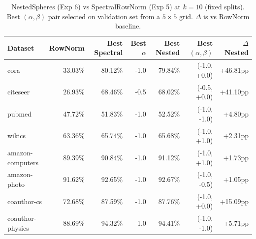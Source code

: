 \begin{table}[t]
\centering\small\setlength{\tabcolsep}{5pt}
\caption{NestedSpheres (Exp 6) vs SpectralRowNorm (Exp 5) at $k=10$ (fixed splits). Best $(\alpha,\beta)$ pair selected on validation set from a $5\times5$ grid. $\Delta$ is vs RowNorm baseline.}
\label{tab:nested_spheres}
\begin{tabular}{lrrrrrr}
\toprule
Dataset & RowNorm & Best Spectral & Best $\alpha$ & Best Nested & Best $(\alpha,\beta)$ & $\Delta$Nested \\
\midrule
cora & 33.03\% & 80.12\% & -1.0 & 79.84\% & (-1.0, +0.0) & +46.81pp \\
citeseer & 26.93\% & 68.46\% & -0.5 & 68.02\% & (-0.5, +0.0) & +41.10pp \\
pubmed & 47.72\% & 51.83\% & -1.0 & 52.52\% & (-1.0, -1.0) & +4.80pp \\
wikics & 63.36\% & 65.74\% & -1.0 & 65.68\% & (-1.0, +1.0) & +2.31pp \\
amazon\mbox{-}computers & 89.39\% & 90.84\% & -1.0 & 91.12\% & (-1.0, +1.0) & +1.73pp \\
amazon\mbox{-}photo & 91.62\% & 92.65\% & -1.0 & 92.67\% & (-1.0, -0.5) & +1.05pp \\
coauthor\mbox{-}cs & 72.68\% & 87.59\% & -1.0 & 87.76\% & (-1.0, +0.0) & +15.09pp \\
coauthor\mbox{-}physics & 88.69\% & 94.32\% & -1.0 & 94.41\% & (-1.0, -1.0) & +5.71pp \\
\bottomrule\end{tabular}\end{table}